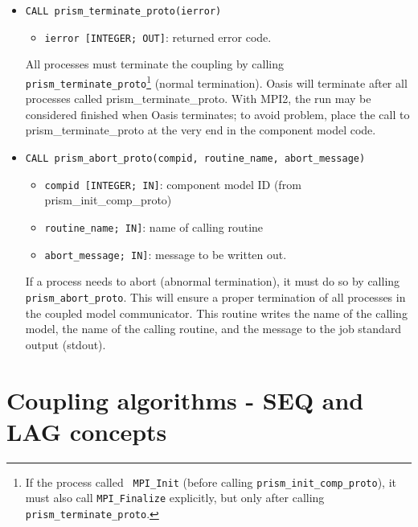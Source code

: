 \begin{itemize}

\item {\tt CALL prism\_terminate\_proto(ierror)}
  \begin{itemize}
  \item {\tt ierror [INTEGER; OUT]}: returned error code.
  \end{itemize}
  All processes must terminate the coupling by calling {\tt
  prism\_terminate\_proto}\footnote{If the process called {\tt
  MPI\_Init} (before calling {\tt prism\_init\_comp\_proto}), it must
  also call {\tt MPI\_Finalize} explicitly, but only after calling
  {\tt prism\_terminate\_proto}.} (normal termination). Oasis will
  terminate after all processes called
  prism\_terminate\_proto. With MPI2, the run may be considered
  finished when Oasis terminates; to avoid problem, place the call
  to prism\_terminate\_proto at the very end in the component model code.

\item {\tt CALL prism\_abort\_proto(compid, routine\_name, abort\_message)}
\begin{itemize}
  \item {\tt compid [INTEGER; IN]}: component model ID (from
prism\_init\_comp\_proto) 
  \item {\tt routine\_name; IN]}: name of calling routine
  \item {\tt abort\_message; IN]}: message to be written out.
\end{itemize}

 If a process needs to abort (abnormal termination), it must do so by
 calling {\tt prism\_abort\_proto}. This will ensure a proper
 termination of all processes in the coupled model communicator. This
 routine writes the name of the calling model, the name of the
 calling routine, and the message to the job standard output (stdout).

\end{itemize}


\section{Coupling algorithms - SEQ and LAG concepts}
\label{subsubsec_Algoritms}

